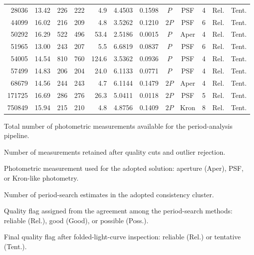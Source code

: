 \begin{table}[!htbp]
\begin{threeparttable}
\begin{tabular}{rrrrrrrccrcc}
28036 & 13.42 & 226 & 222 & 4.9 & 4.4503 & 0.1598 & $P$ & PSF & 4 & Rel. & Tent. \\
44099 & 16.02 & 216 & 209 & 4.8 & 3.5262 & 0.1210 & $2P$ & PSF & 6 & Rel. & Tent. \\
50292 & 16.29 & 522 & 496 & 53.4 & 2.5186 & 0.0015 & $P$ & Aper & 4 & Rel. & Tent. \\
51965 & 13.00 & 243 & 207 & 5.5 & 6.6819 & 0.0837 & $P$ & PSF & 6 & Rel. & Tent. \\
54005 & 14.54 & 810 & 760 & 124.6 & 3.5362 & 0.0936 & $P$ & PSF & 4 & Rel. & Tent. \\
57499 & 14.83 & 206 & 204 & 24.0 & 6.1133 & 0.0771 & $P$ & PSF & 4 & Rel. & Tent. \\
68679 & 14.56 & 244 & 243 & 4.7 & 6.1144 & 0.1479 & $2P$ & Aper & 4 & Rel. & Tent. \\
171725 & 16.69 & 286 & 276 & 26.3 & 5.0411 & 0.0118 & $2P$ & PSF & 5 & Rel. & Tent. \\
750849 & 15.94 & 215 & 210 & 4.8 & 4.8756 & 0.1409 & $2P$ & Kron & 8 & Rel. & Tent. \\
\bottomrule
\end{tabular}
\begin{tablenotes}
\footnotesize
\item[$a$] Total number of photometric measurements available for the period-analysis pipeline.
\item[$b$] Number of measurements retained after quality cuts and outlier rejection.
\item[$c$] Photometric measurement used for the adopted solution: aperture (Aper), PSF, or Kron-like photometry.
\item[$d$] Number of period-search estimates in the adopted consistency cluster.
\item[$e$] Quality flag assigned from the agreement among the period-search methods: reliable (Rel.), good (Good), or possible (Poss.).
\item[$f$] Final quality flag after folded-light-curve inspection: reliable (Rel.) or tentative (Tent.).
\end{tablenotes}
\end{threeparttable}
\end{table}
